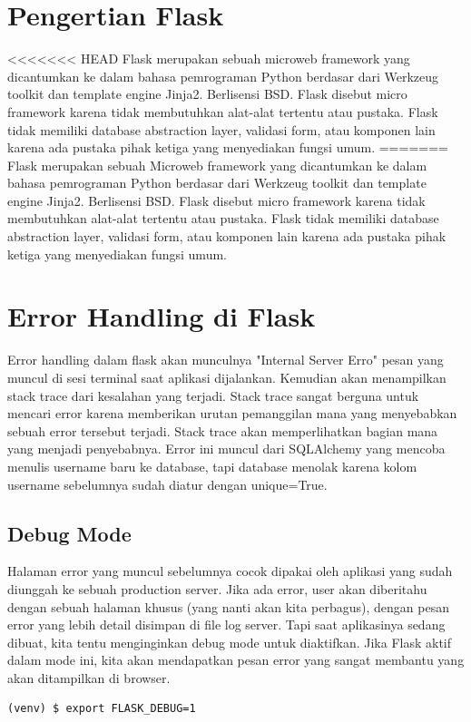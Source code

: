 
\section{Pengertian Flask}
<<<<<<< HEAD
Flask merupakan sebuah microweb framework yang dicantumkan ke dalam bahasa pemrograman Python berdasar dari Werkzeug toolkit dan template engine Jinja2. Berlisensi BSD. Flask disebut micro framework karena tidak membutuhkan alat-alat tertentu atau pustaka. Flask tidak memiliki database abstraction layer, validasi form, atau komponen lain karena ada pustaka pihak ketiga yang menyediakan fungsi umum.
=======
Flask merupakan sebuah Microweb framework yang dicantumkan ke dalam bahasa pemrograman Python berdasar dari Werkzeug toolkit dan template engine Jinja2. Berlisensi BSD. Flask disebut micro framework karena tidak membutuhkan alat-alat tertentu atau pustaka. Flask tidak memiliki database abstraction layer, validasi form, atau komponen lain karena ada pustaka pihak ketiga yang menyediakan fungsi umum.

\section{Error Handling di Flask}
Error handling dalam flask akan munculnya "Internal Server Erro" pesan yang muncul di sesi terminal saat aplikasi dijalankan. Kemudian akan menampilkan  stack trace dari kesalahan yang terjadi. Stack trace sangat berguna untuk mencari error karena memberikan urutan pemanggilan mana yang menyebabkan sebuah error tersebut terjadi. Stack trace akan memperlihatkan bagian mana yang menjadi penyebabnya. Error ini muncul dari SQLAlchemy yang mencoba menulis username baru ke database, tapi database menolak karena kolom username sebelumnya sudah diatur dengan unique=True.

\subsection{Debug Mode}
Halaman error yang muncul sebelumnya cocok dipakai oleh aplikasi yang sudah diunggah ke sebuah production server. Jika ada error, user akan diberitahu dengan sebuah halaman khusus (yang nanti akan kita perbagus), dengan pesan error yang lebih detail disimpan di file log server.
Tapi saat aplikasinya sedang dibuat, kita tentu menginginkan debug mode untuk diaktifkan. Jika Flask aktif dalam mode ini, kita akan mendapatkan pesan error yang sangat membantu yang akan ditampilkan di browser.

\begin{verbatim}
(venv) $ export FLASK_DEBUG=1
\end{verbatim}


